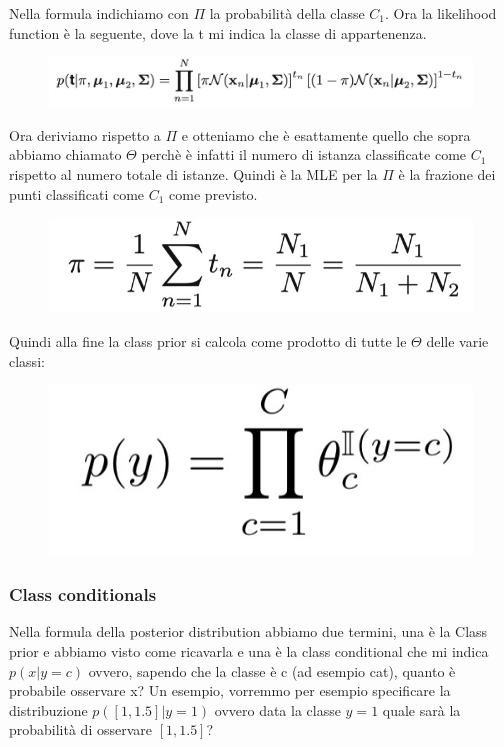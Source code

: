 \documentclass[14pt]{extreport}
\begin{document}
Nella formula indichiamo con $\Pi$ la probabilità della classe $C_1$. Ora la likelihood function è la seguente, dove la t mi indica la classe di
appartenenza.

\begin{figure}[H]
	\centering
	\includegraphics[width=0.7\linewidth]{204.jpeg}
\end{figure}

Ora deriviamo rispetto a $\Pi$ e otteniamo che è esattamente quello che sopra abbiamo chiamato $\Theta$ perchè è infatti il numero di istanza
classificate come $C_1$ rispetto al numero totale di istanze. Quindi è la MLE per la $\Pi$ è la frazione dei punti classificati come $C_1$ come
previsto.

\begin{figure}[H]
	\centering
	\includegraphics[width=0.7\linewidth]{205.jpeg}
\end{figure}

Quindi alla fine la class prior si calcola come prodotto di tutte le $\Theta$ delle varie classi:

\begin{figure}[H]
	\centering
	\includegraphics[width=0.3\linewidth]{206.jpeg}
\end{figure}

\subsubsection{Class conditionals}

Nella formula della posterior distribution abbiamo due termini, una è la Class prior e abbiamo visto come ricavarla e una è la class conditional che
mi indica $p(x|y=c)$ ovvero, sapendo che la classe è c (ad esempio cat), quanto è probabile osservare x? Un esempio, vorremmo per esempio specificare
la distribuzione $p([1, 1.5]| y = 1)$ ovvero data la classe $y=1$ quale sarà la probabilità di osservare $[1, 1.5]$?
\end{document}
